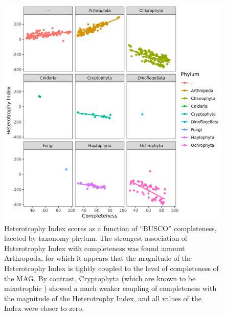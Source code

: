 \documentclass[12pt]{article}
\numberwithin{equation}{section}
\begin{document}
\begin{figure}
    \centering
    \includegraphics[width=0.95\columnwidth]{si-figures/heterotrophyindex_group.png}
    \caption{Heterotrophy Index scores as a function of ``BUSCO'' completeness, faceted by taxonomy phylum. The strongest association of Heterotrophy Index with completeness was found amount Arthropoda, for which it appears that the magnitude of the Heterotrophy Index is tightly coupled to the level of completeness of the MAG. By contrast, Cryptophyta (which are known to be mixotrophic \citep{jones2000mixotrophy}) showed a much weaker coupling of completeness with the magnitude of the Heterotrophy Index, and all values of the Index were closer to zero.}
    \label{fig:het-ind}
\end{figure}
\end{document}
